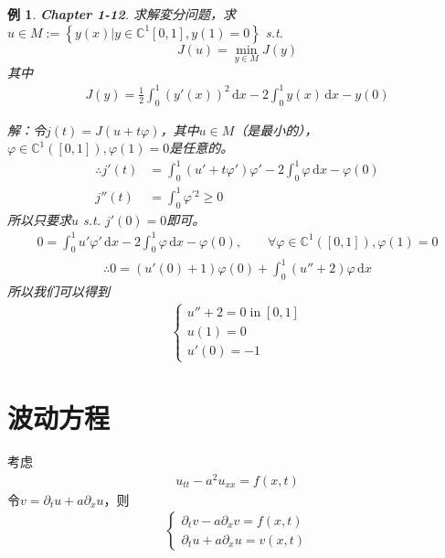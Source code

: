 \documentclass[11pt, a4paper]{article}
\theoremstyle{theorem}
\newtheorem{eg}[thm]{例}
\newcommand{\intd}[1]{\,\mathrm{d}{#1}}
\begin{document}
\begin{eg}
\textbf{Chapter 1-12}. 求解変分问题，求$u \in M := \left\{y(x) | y \in \mathbb{C}^1[0,1] , y(1) = 0\right\}$ s.t.
$$
J(u) = \min\limits_{y \in M} J(y)
$$
其中
\begin{align}
    J(y) = \frac{1}{2} \int_0^1 (y'(x))^2 \intd x - 2 \int_0^1 y(x)\intd x - y(0)
\end{align}

解：令$j(t) = J(u + t \varphi)$，其中$u \in M$（是最小的），$\varphi \in \mathbb{C}^1([0,1]), \varphi(1) = 0$是任意的。
\begin{align*}
\therefore j'(t) &= \int_0^1 (u' + t \varphi') \varphi' - 2\int_0^1 \varphi \intd x - \varphi(0) \\
j''(t) &= \int_0^1 \varphi^{'2} \geq 0
\end{align*}
所以只要求$u$ s.t. $j'(0) = 0$即可。
\begin{align*}
0 = \int_0^1 u' \varphi' \intd x - 2 \int_0^1 \varphi \intd x - \varphi(0), \quad \quad \forall \varphi \in \mathbb{C}^1([0,1]), \varphi(1) = 0
\end{align*}
\begin{align*}
\therefore 0 = \left(u'(0) +1\right) \varphi(0) + \int_0^1 (u'' + 2) \varphi \intd x
\end{align*}
所以我们可以得到
\begin{align*}
    \begin{cases}
    u'' + 2 = 0 \; \text{in} \; [0,1]\\
    u(1) = 0 \\
    u'(0) = -1
    \end{cases}
\end{align*}
\end{eg}

\newpage

\section{波动方程}

考虑
\begin{align}
    u_{tt} - a^2 u_{xx} = f(x,t)
\end{align}
令$v = \partial_t u + a \partial_x u$，则
\begin{align*}
    \begin{cases}
    \partial_t v - a\partial_x v = f(x,t) \\
    \partial_t u + a \partial_x u = v(x,t)
    \end{cases}
\end{align*}
\end{document}
